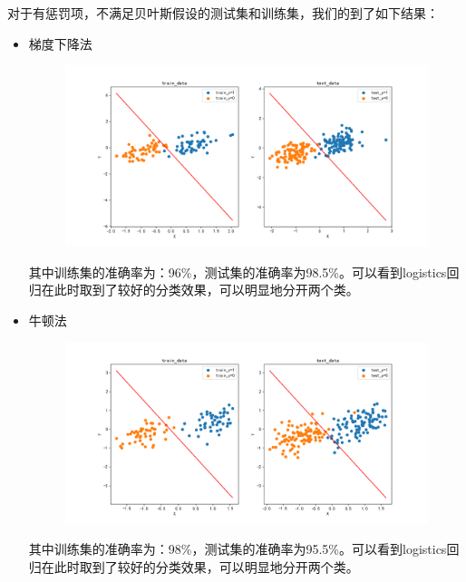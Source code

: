 \documentclass[lang=cn,a4paper,cite=authoryear]{elegantpaper}
\begin{document}
\subsubsection*{}
对于有惩罚项，不满足贝叶斯假设的测试集和训练集，我们的到了如下结果：
\begin{itemize}
	\par
	\item 梯度下降法
	\begin{center}
		\begin{figure}[H]
			\centering
			\includegraphics[scale=0.5]{test02}
		\end{figure}
	\end{center}
其中训练集的准确率为：96\%，测试集的准确率为98.5\%。可以看到logistics回归在此时取到了较好的分类效果，可以明显地分开两个类。
	\par
	\item 牛顿法
	\begin{center}
		\begin{figure}[H]
			\centering
			\includegraphics[scale=0.5]{nttest02}
		\end{figure}
	\end{center}
其中训练集的准确率为：98\%，测试集的准确率为95.5\%。可以看到logistics回归在此时取到了较好的分类效果，可以明显地分开两个类。

\end{itemize}
\end{document}
